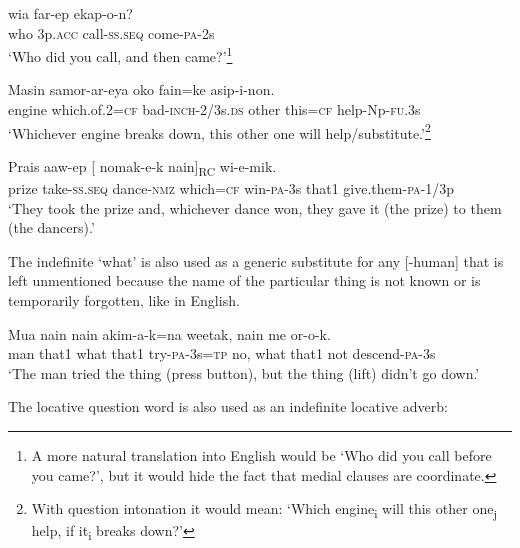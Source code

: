 \ea%
\label{ex:3:x643}
\gll {} wia far-ep ekap-o-n? \\
who 3p.\textsc{acc} call-\textsc{ss}.\textsc{seq} come-\textsc{pa}-2s\\
\glt`Who did you call, and then came?'\footnote{A more natural translation into English would be `Who did you call before you came?', but it would hide the fact that medial clauses are coordinate.}
\z

\ea%
\label{ex:3:x644}
\gll Masin  samor-ar-eya oko fain=ke asip-i-non.\\
engine which.of.2=\textsc{cf} bad-\textsc{inch}-2/3s.\textsc{ds} other this=\textsc{cf} help-Np-\textsc{fu}.3s\\
\glt`Whichever engine breaks down, this other one will help/substitute.'\footnote{With question intonation it would mean: `Which engine\textsubscript{i} will this other one\textsubscript{j} help, if it\textsubscript{i} breaks down?'}
\z

\ea%
\label{ex:3:x645}
\gll Prais aaw-ep [  nomak-e-k nain]\textsubscript{RC} wi-e-mik.\\
prize take-\textsc{ss}.\textsc{seq} dance-\textsc{nmz} which=\textsc{cf} win-\textsc{pa}-3s that1 give.them-\textsc{pa}-1/3p\\
\glt`They took the prize and, whichever dance won, they gave it (the prize) to them (the dancers).'
\z

The indefinite  `what' is also used as a generic substitute for any [\nobreakdash-human]  that is left unmentioned because the name of the particular thing is not known or is temporarily forgotten, like  in English.

\ea%
\label{ex:3:x646}
\gll Mua nain  nain akim-a-k=na weetak,   nain me or-o-k.\\
man that1 what that1 try-\textsc{pa}-3s=\textsc{tp} no, what that1 not descend-\textsc{pa}-3s\\
\glt`The man tried the thing (press button), but the thing (lift) didn't go down.'
\z

The locative question word  is also used as an indefinite locative adverb:

